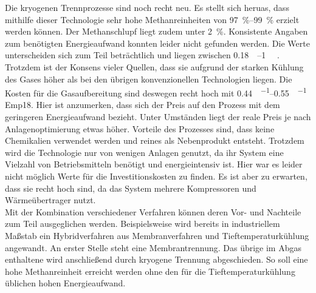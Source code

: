 Die kryogenen Trennprozesse sind noch recht neu. Es stellt sich heruas, dass mithilfe dieser Technologie sehr hohe Methanreinheiten von \SIrange{97}{99}{\percent} erzielt werden können. Der Methanschlupf liegt zudem unter \SI{2}{\percent}. Konsistente Angaben zum benötigten Energieaufwand konnten leider nicht gefunden werden. Die Werte unterscheiden sich zum Teil beträchtlich und liegen zwischen \SIrange{0,18}{1}{\kwh\normvol} \parencite{Emp18} \parencite{KGKK2019}. Trotzdem ist der Konsens vieler Quellen, dass sie aufgrund der starken Kühlung des Gases höher als bei den übrigen konvenzionellen Technologien liegen. Die Kosten für die Gasaufbereitung sind deswegen recht hoch mit \SIrange{0,44}{0,55}{\sieuro\per\normvol} {Emp18}. Hier ist anzumerken, dass sich der Preis auf den Prozess mit dem geringeren Energieaufwand bezieht. Unter Umständen liegt der reale Preis je nach Anlagenoptimierung etwas höher. Vorteile des Prozesses sind, dass keine Chemikalien verwendet werden und reines  als Nebenprodukt entsteht. Trotzdem wird die Technologie nur von wenigen Anlagen genutzt, da ihr System eine Vielzahl von Betriebsmitteln benötigt und energieintensiv ist. Hier war es leider nicht möglich Werte für die Investitionskosten zu finden. Es ist aber zu erwarten, dass sie recht hoch sind, da das System mehrere Kompressoren und Wärmeübertrager nutzt. \parencite{KGKK2019} \parencite{AONC2019} \\

Mit der Kombination verschiedener Verfahren können deren Vor- und Nachteile zum Teil ausgeglichen werden. Beispielsweise wird bereits in industriellem Maßstab ein Hybridverfahren aus Membranverfahren und Tieftemperaturkühlung angewandt. An erster Stelle steht eine Membrantrennung. Das übrige im Abgas enthaltene  wird anschließend durch kryogene Trennung abgeschieden. So soll eine hohe Methanreinheit erreicht werden ohne den für die Tieftemperaturkühlung üblichen hohen Energieaufwand. \parencite{dena2019}
\smallskip


